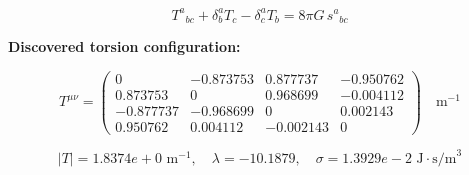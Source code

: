 
\begin{equation}
  T^a{}_{bc} + \delta^a_b T_c - \delta^a_c T_b = 8\pi G \, s^a{}_{bc}
\end{equation}

\textbf{Discovered torsion configuration:}

\begin{equation}
  T^{\mu\nu} = \begin{pmatrix}
    0 & -0.873753 & 0.877737 & -0.950762 \\
    0.873753 & 0 & 0.968699 & -0.004112 \\
    -0.877737 & -0.968699 & 0 & 0.002143 \\
    0.950762 & 0.004112 & -0.002143 & 0
  \end{pmatrix} \quad \text{m}^{-1}
\end{equation}

\begin{equation}
  |T| = 1.8374e+0 \text{ m}^{-1}, \quad
  \lambda = -10.1879, \quad
  \sigma = 1.3929e-2 \text{ J}\cdot\text{s/m}^3
\end{equation}